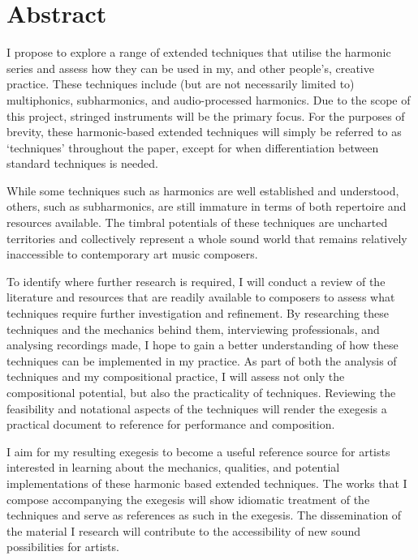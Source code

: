 \chapter*{Abstract}

I propose to explore a range of extended techniques that utilise the harmonic series and assess how they can be used in my, and other people's, creative practice. These techniques include (but are not necessarily limited to) multiphonics, subharmonics, and audio-processed harmonics. Due to the scope of this project, stringed instruments will be the primary focus. For the purposes of brevity, these harmonic-based extended techniques will simply be referred to as `techniques' throughout the paper, except for when differentiation between standard techniques is needed. 

While some techniques such as harmonics are well established and understood, others, such as subharmonics, are still immature in terms of both repertoire and resources available.  The timbral potentials of these techniques are uncharted territories and collectively represent a whole sound world that remains relatively inaccessible to contemporary art music composers.

To identify where further research is required, I will conduct a review of the literature and resources that are readily available to composers to assess what techniques require further investigation and refinement. By researching these techniques and the mechanics behind them, interviewing professionals, and analysing recordings made, I hope to gain a better understanding of how these techniques can be implemented in my practice. As part of both the analysis of techniques and my compositional practice, I will assess not only the compositional potential, but also the practicality of techniques. Reviewing the feasibility and notational aspects of the techniques will render the exegesis a practical document to reference for performance and composition.

I aim for my resulting exegesis to become a useful reference source for artists interested in learning about the mechanics, qualities, and potential implementations of these harmonic based extended techniques. The works that I compose accompanying the exegesis will show idiomatic treatment of the techniques and serve as references as such in the exegesis. The dissemination of the material I research will contribute to the accessibility of new sound possibilities for artists.